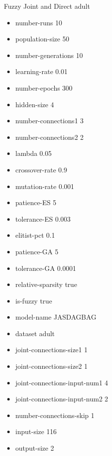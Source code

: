 Fuzzy Joint and Direct
adult
\begin{itemize}
\item number-runs 10
\item population-size 50
\item number-generations 10
\item learning-rate 0.01
\item number-epochs 300
\item hidden-size 4
\item number-connections1 3
\item number-connections2 2
\item lambda 0.05
\item crossover-rate 0.9
\item mutation-rate 0.001
\item patience-ES 5
\item tolerance-ES 0.003
\item elitist-pct 0.1
\item patience-GA 5
\item tolerance-GA 0.0001
\item relative-sparsity true
\item is-fuzzy true
\item model-name JASDAGBAG
\item dataset adult
\item joint-connections-size1 1
\item joint-connections-size2 1
\item joint-connections-input-num1 4
\item joint-connections-input-num2 2
\item number-connections-skip 1
\item input-size 116
\item output-size 2
\end{itemize}

